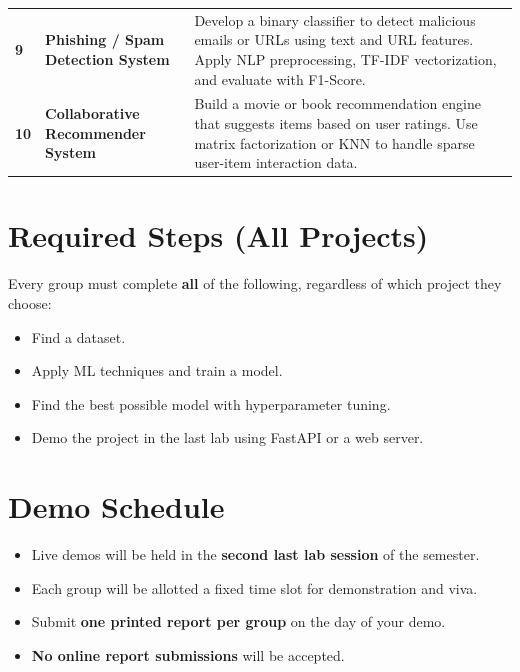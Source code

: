 \documentclass[12pt, a4paper]{article}
\begin{document}
\begin{table}[ht]
\begin{tabularx}{\textwidth}{
  >{\centering\bfseries}p{0.6cm}
  >{\bfseries}p{4.5cm}
  >{\raggedright\arraybackslash}X
}
9 & Phishing / Spam Detection System
  & Develop a binary classifier to detect malicious emails or URLs using text and URL features. Apply NLP
    preprocessing, TF-IDF vectorization, and evaluate with F1-Score. \\
\rowcolor{rowgray}
10 & Collaborative Recommender System
   & Build a movie or book recommendation engine that suggests items based on user ratings. Use matrix
     factorization or KNN to handle sparse user-item interaction data. \\
\bottomrule
\end{tabularx}
\end{table}

\section{Required Steps (All Projects)}

Every group must complete \textbf{all} of the following, regardless of which project they choose:

\begin{itemize}[leftmargin=1.5em, itemsep=0.3em]
    \item Find a dataset.
    \item Apply ML techniques and train a model.
    \item Find the best possible model with hyperparameter tuning.
    \item Demo the project in the last lab using FastAPI or a web server.
\end{itemize}

\section{Demo Schedule}

\begin{itemize}[leftmargin=1.5em, itemsep=0.3em]
    \item Live demos will be held in the \textbf{second last lab session} of the semester.
    \item Each group will be allotted a fixed time slot for demonstration and viva.
    \item Submit \textbf{one printed report per group} on the day of your demo.
    \item \textbf{No online report submissions} will be accepted.
\end{itemize}
\end{document}
